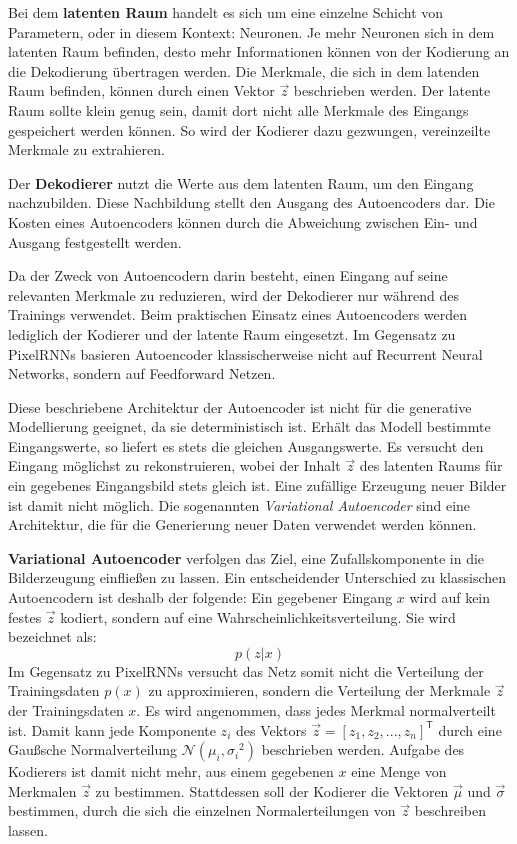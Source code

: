 Bei dem \textbf{latenten Raum} handelt es sich um eine einzelne Schicht von Parametern, oder in diesem Kontext: Neuronen. Je mehr Neuronen sich in dem latenten Raum befinden, desto mehr Informationen können von der Kodierung an die Dekodierung übertragen werden. Die Merkmale, die sich in dem latenden Raum befinden, können durch einen Vektor $\vec{z}$ beschrieben werden. Der latente Raum sollte klein genug sein, damit dort nicht alle Merkmale des Eingangs gespeichert werden können. So wird der Kodierer dazu gezwungen, vereinzeilte Merkmale zu extrahieren. 

Der \textbf{Dekodierer} nutzt die Werte aus dem latenten Raum, um den Eingang nachzubilden. Diese Nachbildung stellt den Ausgang des Autoencoders dar. Die Kosten eines Autoencoders können durch die Abweichung zwischen Ein- und Ausgang festgestellt werden. 

Da der Zweck von Autoencodern darin besteht, einen Eingang auf seine relevanten Merkmale zu reduzieren, wird der Dekodierer nur während des Trainings verwendet. Beim praktischen Einsatz eines Autoencoders werden lediglich der Kodierer und der latente Raum eingesetzt. Im Gegensatz zu \acp{PixelRNN} basieren Autoencoder klassischerweise nicht auf Recurrent Neural Networks, sondern auf Feedforward Netzen.

Diese beschriebene Architektur der Autoencoder ist nicht für die generative Modellierung geeignet, da sie deterministisch ist. Erhält das Modell bestimmte Eingangswerte, so liefert es stets die gleichen Ausgangswerte. Es versucht den Eingang möglichst zu rekonstruieren, wobei der Inhalt $\vec{z}$ des latenten Raums für ein gegebenes Eingangsbild stets gleich ist. Eine zufällige Erzeugung neuer Bilder ist damit nicht möglich. Die sogenannten \emph{Variational Autoencoder} sind eine Architektur, die für die Generierung neuer Daten verwendet werden können. \cite{visualApproach}

\textbf{Variational Autoencoder} verfolgen das Ziel, eine Zufallskomponente in die Bilderzeugung einfließen zu lassen. Ein entscheidender Unterschied zu klassischen Autoencodern ist deshalb der folgende: Ein gegebener Eingang $x$ wird auf kein festes $\vec{z}$ kodiert, sondern auf eine Wahrscheinlichkeitsverteilung. Sie wird bezeichnet als:
\begin{equation}
   p(z|x)
\end{equation}
Im Gegensatz zu \acp{PixelRNN} versucht das Netz somit nicht die Verteilung der Trainingsdaten $p(x)$ zu approximieren, sondern die Verteilung der Merkmale $\vec{z}$ der Trainingsdaten $x$.
Es wird angenommen, dass jedes Merkmal normalverteilt ist. Damit kann jede Komponente $z_{i}$ des Vektors $\vec{z} = [z_{1}, z_{2}, ..., z_{n}]^\mathsf{T}$ durch eine Gaußsche Normalverteilung $\mathcal{N}(\mu_{i}, {\sigma_{i}}^{2})$ beschrieben werden. Aufgabe des Kodierers ist damit nicht mehr, aus einem gegebenen $x$ eine Menge von Merkmalen $\vec{z}$ zu bestimmen. Stattdessen soll der Kodierer die Vektoren $\vec{\mu}$ und $\vec{\sigma}$ bestimmen, durch die sich die einzelnen Normalerteilungen von $\vec{z}$ beschreiben lassen. 

